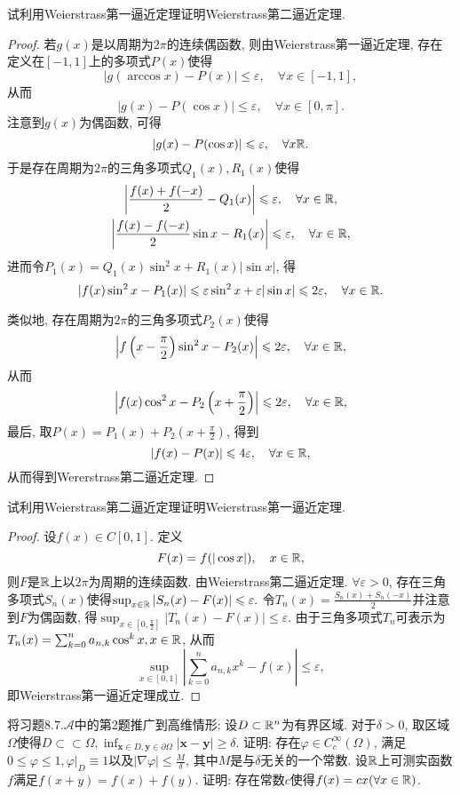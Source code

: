 \begin{quizb}
\woe 试利用Weierstrass第一逼近定理证明Weierstrass第二逼近定理.
\begin{proof}
若\(g(x)\)是以周期为\(2\pi\)的连续偶函数, 则由Weierstrass第一逼近定理, 存在定义在\([-1,1]\)上的多项式\(P(x)\)使得\[|g(\arccos x)-P(x)|\leqslant\varepsilon,\quad\forall x\in[-1,1],\]从而\[|g(x)-P(\cos x)|\leqslant\varepsilon,\quad\forall x\in[0,\pi].\]注意到\(g(x)\)为偶函数, 可得\[|g(x)-P(\cos x)|\leqslant\varepsilon,\quad\forall x\mathbb{R}.\]于是存在周期为\(2\pi\)的三角多项式\(Q_1(x),R_1(x)\)使得\begin{gather*}
\left|\frac{f(x)+f(-x)}{2}-Q_1(x)\right|\leqslant\varepsilon,\quad\forall x\in\mathbb{R},\\
\left|\frac{f(x)-f(-x)}{2}\sin x-R_1(x)\right|\leqslant\varepsilon,\quad\forall x\in\mathbb{R},
\end{gather*}
进而令\(P_1(x)=Q_1(x)\sin^2x+R_1(x)|\sin x|\), 得\[|f(x)\sin^2x-P_1(x)|\leqslant\varepsilon\sin^2x+\varepsilon|\sin x|\leqslant2\varepsilon,\quad\forall x\in\mathbb{R}.\]

类似地, 存在周期为\(2\pi\)的三角多项式\(P_2(x)\)使得\[\left|f\left(x-\frac{\pi}{2}\right)\sin^2x-P_2(x)\right|\leqslant 2\varepsilon,\quad\forall x\in\mathbb{R},\]从而\[\left|f(x)\cos^2x-P_2\left(x+\frac{\pi}{2}\right)\right|\leqslant 2\varepsilon,\quad\forall x\in\mathbb{R},\]
最后, 取\(P(x)=P_1(x)+P_2\left(x+\frac{\pi}{2}\right)\), 得到\[|f(x)-P(x)|\leqslant 4\varepsilon,\quad\forall x\in\mathbb{R},\]从而得到Wererstrass第二逼近定理.
\end{proof}
\woe 试利用Weierstrass第二逼近定理证明Weierstrass第一逼近定理.
\begin{proof}
设\(f(x)\in C[0,1]\). 定义\[F(x)=f(|\cos x|),\quad x\in\mathbb{R},\]则\(F\)是\(\mathbb{R}\)上以\(2\pi\)为周期的连续函数. 由Weierstrass第二逼近定理. \(\forall\varepsilon>0\), 存在三角多项式\(S_n(x)\)使得\(\sup_{x\in\mathbb{R}}|S_n(x)-F(x)|\leqslant\varepsilon.\) 令\(T_n(x)=\frac{S_n(x)+S_n(-x)}{2}\)并注意到\(F\)为偶函数, 得\(\sup_{x\in\left[0,\frac{\pi}{2}\right]}|T_n(x)-F(x)|\leqslant\varepsilon\). 由于三角多项式\(T_n\)可表示为\(T_n(x)=\sum_{k=0}^{n}a_{n,k}\cos^kx,x\in\mathbb{R}\), 从而\[\sup_{x\in[0,1]}\left|\sum_{k=0}^{n}a_{n,k}x^k-f(x)\right|\leqslant\varepsilon,\]即Weierstrass第一逼近定理成立.
\end{proof}
\woe 将习题\(8.7.\boldsymbol{\mathcal{A}}\)中的第2题推广到高维情形: 设\(D\subset\mathbb{R}^n\)为有界区域. 对于\(\delta>0\), 取区域\(\varOmega\)使得\(D\subset\subset \varOmega,\inf_{\boldsymbol{x}\in D,\boldsymbol{y}\in\partial\varOmega}|\boldsymbol{x}-\boldsymbol{y}|\geqslant\delta\). 证明: 存在\(\varphi\in C_c^{\infty}(\varOmega)\), 满足\(0\leqslant\varphi\leqslant 1,\varphi\big|_D\equiv 1\)以及\(|\nabla\varphi|\leqslant\frac{M}{\delta}\), 其中\(M\)是与\(\delta\)无关的一个常数.
\woe 设\(\mathbb{R}\)上可测实函数\(f\)满足\(f(x+y)=f(x)+f(y)\). 证明: 存在常数\(c\)使得\(f(x)=cx(\forall x\in\mathbb{R})\).


\end{quizb}
